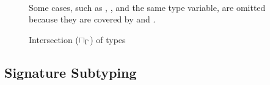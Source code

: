 \begin{figure}
{\begin{minipage}{\ruleswidth}
\[\begin{array}{ccccll}
\end{array}
\]
\end{minipage}}
\caption{Intersection ($\sqcap_{\Gamma}$) of types}\label{fig:ty-join-meet}
\begin{tablenotes}[para]
Some cases, such as \tybot, \tyany, and the same type variable,
are omitted because they are covered by  and 
.
\end{tablenotes}
\end{figure}

\subsection{Signature Subtyping}


